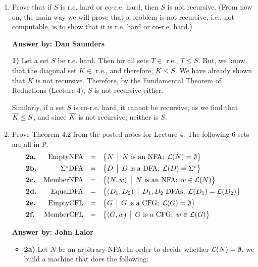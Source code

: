 \documentclass[12pt]{article}
\begin{document}
\noindent{}
\addtocounter{section}{1}

\begin{enumerate}

\item Prove that if $S$ is r.e. hard or co-r.e. hard, then $S$ is not recursive. (From now on, the main way we will
prove that a problem is not recursive, i.e., not computable, is to show that it is r.e. hard or co-r.e. hard.)


{\bf Answer by: Dan Saunders} 

\textbf{1)} Let a set $S$ be r.e. hard.
  Then for all sets $T \in$ r.e., $T \leq S$. But, we know that the diagonal set $K \in$
  r.e., and therefore, $K \leq S$. We have already shown that $K$ is not recursive.
  Therefore, by the Fundamental Theorem of Reductions (Lecture 4), 
  $S$ is not recursive  either. 
  
  Similarly, if a set $S$ is co-r.e. hard, it
  cannot be recursive, as we find that $\overline{K} \leq S$, and since $\overline{K}$ is not recursive,
  neither is $S$.


\item Prove Theorem 4.2 from the posted notes for Lecture 4.  The following 6 sets are all in P.
\[
\begin{array}{lrcl}
\textbf{2a.}&\mbox{{\rm EmptyNFA}} &=& \bigl\{ N \,\bigm|\, N \mbox{ is an NFA};\; {\cal L}(N) = \emptyset \bigr\} \\[1ex]
\textbf{2b.}&\Sigma^\star\mbox{{\rm DFA}} &=& \bigl\{ D \,\bigm|\, D\mbox{ is a DFA};\;
  {\cal L}(D) = \Sigma^\star \bigr\}\\[1ex]
\textbf{2c.}&\mbox{{\rm MemberNFA}} &=& \bigl\{ (N,w) \,\bigm|\, N \mbox{ is an NFA};\; w\in {\cal L}(N) \bigr\}\\[1ex]
\textbf{2d.}&\mbox{{\rm EqualDFA}} &=& \bigl\{ (D_1,D_2) \,\bigm|\, D_1,D_2 \mbox{ DFAs};\;{\cal L}(D_1) ={\cal L}(D_2) \bigr\}\\[1ex]
\textbf{2e.}&\mbox{{\rm EmptyCFL}} &=& \bigl\{ G \,\bigm|\, G \mbox{ is a CFG};\; {\cal L}(G) =
  \emptyset \bigr\} \\[1ex] 
\textbf{2f.}&\mbox{{\rm MemberCFL}} &=& \bigl\{ (G,w) \,\bigm|\, G \mbox{ is a CFG};\;w\in{\cal L}(G) \bigr\}\\
\end{array}
\]

{\bf Answer by: John Lalor} 

\begin{itemize}

\item \textbf{2a)} Let $N$ be an arbitrary NFA. In order to decide whether ${\cal L}(N) = \emptyset$, we build a machine that does the following:


\end{itemize}
\end{enumerate}
\end{document}
